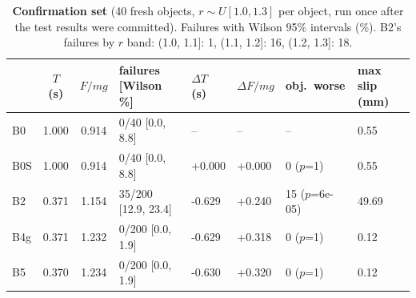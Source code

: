 \begin{table}[!htbp]\centering\footnotesize
\caption{\textbf{Confirmation set} (40 fresh objects, $r\sim U[1.0,1.3]$ per object, run once after the test results were committed). Failures with Wilson 95\% intervals (\%). B2's failures by $r$ band: (1.0, 1.1]: 1, (1.1, 1.2]: 16, (1.2, 1.3]: 18.}\label{tab:confirm}
\setlength{\tabcolsep}{5pt}\begin{tabular}{@{}lcclllll@{}}\toprule
 & $T$ (s) & $F/mg$ & failures [Wilson \%] & $\Delta T$ (s) & $\Delta F/mg$ & obj.\ worse & max slip (mm)\\\midrule
B0 & 1.000 & 0.914 & 0/40 [0.0, 8.8] & -- & -- & -- & 0.55\\
B0S & 1.000 & 0.914 & 0/40 [0.0, 8.8] & +0.000 & +0.000 & 0 ($p$=1) & 0.55\\
B2 & 0.371 & 1.154 & 35/200 [12.9, 23.4] & -0.629 & +0.240 & 15 ($p$=6e-05) & 49.69\\
B4g & 0.371 & 1.232 & 0/200 [0.0, 1.9] & -0.629 & +0.318 & 0 ($p$=1) & 0.12\\
B5 & 0.370 & 1.234 & 0/200 [0.0, 1.9] & -0.630 & +0.320 & 0 ($p$=1) & 0.12\\
\bottomrule\end{tabular}\end{table}